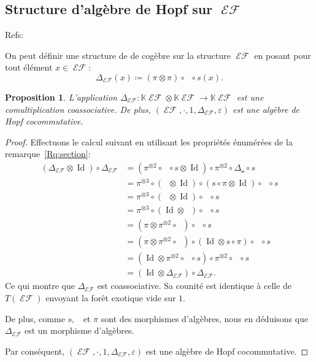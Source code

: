 \documentclass[french]{article}
\theoremstyle{definition}
\theoremstyle{plain}
\newtheorem{Prop}[defi]{Proposition}
\newcommand{\e}{\varepsilon}
\newcommand{\K}{\mathbb{K}}
\DeclareMathOperator{\Dsh}{{\Delta_{\shuffle}}}
\DeclareMathOperator{\EF}{\mathcal{EF}}
\DeclareMathOperator{\Id}{Id}
\begin{document}
\subsection{Structure d'algèbre de Hopf sur $\EF$}

Refs: \cite{Bronasco22ebs, Bronasco22cef, Bronasco25hoi}

On peut définir une structure de de cogèbre sur la structure $\EF$ en posant pour tout élément $x\in\EF$:
\[
\Delta_{\EF}(x)\coloneqq(\pi\otimes \pi) \circ \Dsh \circ s(x). 
\]

\begin{Prop}
	L'application $\Delta_{\EF}:\K\EF\otimes \K\EF \rightarrow \K\EF$ est une comultiplication coassociative. De plus, $(\EF,\cdot, 1, \Delta_{\EF}, \e)$ est une algèbre de Hopf cocommutative.
\end{Prop}
\begin{proof}
 	Effectuons le calcul suivant en utilisant les propriétés énumérées de la remarque~\ref{Rq:section}:
	\begin{align*}
		(\Delta_{\EF} \otimes \Id)\circ \Delta_{\EF}&=(\pi^{\otimes 2} \circ \Dsh \circ s \otimes \Id) \circ \pi^{\otimes 2} \circ \Delta_{\shuffle} \circ s \\
		&=\pi^{\otimes 3}\circ (\Dsh\otimes \Id)\circ (s\circ \pi \otimes \Id)\circ \Dsh \circ s \\
		&=\pi^{\otimes 3}\circ (\Dsh\otimes \Id)\circ \Dsh \circ s \\
		&=\pi^{\otimes 3}\circ (\Id\otimes \Dsh)\circ \Dsh \circ s \\
		&=(\pi \otimes \pi^{\otimes 2}\circ \Dsh) \circ \Dsh \circ s \\
		&=(\pi \otimes \pi^{\otimes 2}\circ \Dsh) \circ (\Id\otimes s \circ \pi) \circ \Dsh \circ s \\
		&=(\Id \otimes \pi^{\otimes 2}\circ \Dsh \circ s) \circ \pi^{\otimes 2}\circ \Dsh \circ s \\
		&= (\Id \otimes \Delta_{\EF})\circ \Delta_{\EF}.
	\end{align*}
	Ce qui montre que $\Delta_{\EF}$ est coassociative. Sa counité est identique à celle de $T(\EF)$ envoyant la forêt exotique vide sur $1$.
	
	De plus, comme $s, \Dsh$ et $\pi$ sont des morphismes d'algèbres, nous en déduisons que $\Delta_{\EF}$ est un morphisme d'algèbres.
	
	Par conséquent, $(\EF,\cdot, 1, \Delta_{\EF}, \e)$ est une algèbre de Hopf cocommutative. 
\end{proof}
\end{document}
